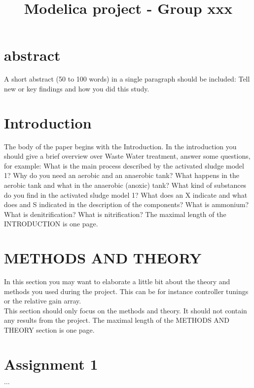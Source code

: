 \documentclass[
	10pt,								%
	letterpaper,         		%
	twocolumn,
	]{article}
\title{\Large \bf
Modelica project - Group xxx}
\date{}
\author{\authorthing}
\begin{document}
\renewcommand\figurename{Fig.}

\setlength{\droptitle}{1.0cm}
\maketitle
\thispagestyle{empty}
\pagestyle{empty}

\normalsize

\section*{abstract}
A short abstract (50 to 100 words) in a single paragraph should be included: Tell new or key findings and how you did this study.    
%
%
\section*{Introduction}\label{sec:Introduction} 
The body of the paper begins with the Introduction. In the introduction you should give a brief overview over Waste Water treatment, answer some questions, for example: What is the main process described by the activated sludge model 1? Why do you need an aerobic and an anaerobic tank? What happens in the aerobic tank and what in the anaerobic (anoxic) tank? What kind of substances do you find in the activated sludge model 1? What does an X indicate and what does and S indicated in the description of the components? What is ammonium? What is denitrification? What is nitrification? The maximal length of the INTRODUCTION is one page.  
%
%
%
\section*{METHODS AND THEORY }\label{sec:METHODS}
In this section you may want to elaborate a little bit about the theory and methods you used during the project. This can be for instance controller tunings or the relative gain array. \\
\indent This section should only focus on the methods and theory. It should not contain any results from the project. The maximal length of the METHODS AND THEORY section is one page.  
%
%
\section*{Assignment 1}\label{sec:Ass1}
$\dots$
%
%
\end{document}
